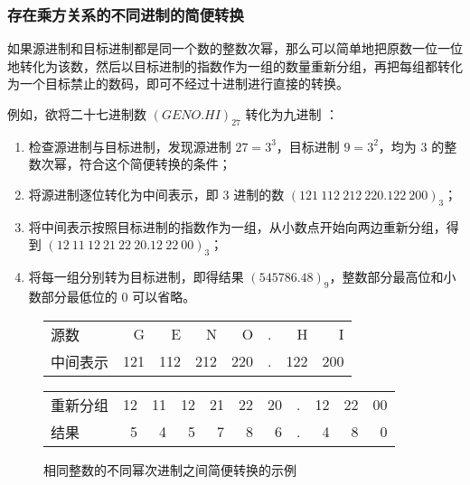         \subsubsection{存在乘方关系的不同进制的简便转换}\label{subsubsec:ArithBasics/positional-notation-presentation-and-conversion/conversion/powered-base}
            如果源进制和目标进制都是同一个数的整数次幂，那么可以简单地把原数一位一位地转化为该数，然后以目标进制的指数作为一组的数量重新分组，再把每组都转化为一个目标禁止的数码，即可不经过十进制进行直接的转换。

            例如，欲将二十七进制数 $(GENO.HI)_{27}$ 转化为九进制 ：
            \begin{enumerate}
                \item 检查源进制与目标进制，发现源进制 $27 = 3 ^ 3$，目标进制 $9 = 3 ^ 2$，均为 $3$ 的整数次幂，符合这个简便转换的条件；
                \item 将源进制逐位转化为中间表示，即 $3$ 进制的数 $(121\ 112\ 212\ 220.122\ 200)_3$；
                \item 将中间表示按照目标进制的指数作为一组，从小数点开始向两边重新分组，得到 $(12\ 11\ 12\ 21\ 22\ 20.12\ 22\ 00)_3$；
                \item 将每一组分别转为目标进制，即得结果 $(545786.48)_9$，整数部分最高位和小数部分最低位的 $0$ 可以省略。
            \end{enumerate}

            \begin{figure}
                \centering
                \begin{tabular}{lrrrrrrr}
                    源数     &   G &   E &   N &   O & . &   H &   I \\
                    中间表示 & 121 & 112 & 212 & 220 & . & 122 & 200 \\ \hline
                \end{tabular}
                \begin{tabular}{lrrrrrrrrrr}
                    重新分组 & 12 & 11 & 12 & 21 & 22 & 20 & . & 12 & 22 & 00 \\
                    结果     &  5 &  4 &  5 &  7 &  8 &  6 & . &  4  &  8 &  0
                \end{tabular}
                \caption{相同整数的不同幂次进制之间简便转换的示例}
                \label{fig:ArithBasics/positional-notation-presentation-and-conversion/conversion/powered-base/with-intermediate}
            \end{figure}
